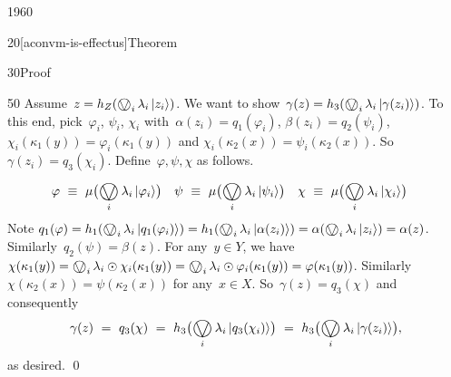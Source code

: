 \begin{parsec}{1960}
\begin{point}{20}[aconvm-is-effectus]{Theorem}
\begin{point}{30}{Proof}
\begin{point}{50}
Assume~$z = h_Z(\bigovee_i \lambda_i \ket{z_i})$.
We want to show~$\gamma(z) = h_3(\bigovee_i \lambda_i \ket{\gamma(z_i)})$.
To this end, pick~$\varphi_i$, $\psi_i$, $\chi_i$
with~$\alpha(z_i) = q_1(\varphi_i)$,
$\beta(z_i) = q_2(\psi_i)$,
$\chi_i(\kappa_1(y)) = \varphi_i(\kappa_1(y))$
and $\chi_i(\kappa_2(x)) = \psi_i(\kappa_2(x))$.
So $\gamma(z_i) = q_3(\chi_i)$.
Define~$\varphi,\psi,\chi$ as follows.
\begin{align*}
\varphi &\ \equiv\  \mu\bigl(\bigovee_i \lambda_i \ket{\varphi_i}\bigr)&
\psi &\ \equiv\  \mu\bigl(\bigovee_i \lambda_i \ket{\psi_i}\bigr) &
\chi &\ \equiv\  \mu\bigl(\bigovee_i \lambda_i \ket{\chi_i}\bigr)
\end{align*}
Note
$q_1(\varphi)
    = h_1(\bigovee_i \lambda_i \ket{q_1(\varphi_i)})
    = h_1(\bigovee_i \lambda_i \ket{\alpha(z_i)})
    = \alpha(\bigovee_i \lambda_i \ket{z_i})
    = \alpha(z)$.
Similarly~$q_2(\psi) = \beta(z)$.
For any~$y \in Y$,
    we have
    $
    \chi(\kappa_1(y))
    = \bigovee_i \lambda_i \odot \chi_i(\kappa_1(y))
    = \bigovee_i \lambda_i \odot \varphi_i(\kappa_1(y))
    = \varphi(\kappa_1(y))
    $.
Similarly~$\chi(\kappa_2(x)) = \psi(\kappa_2(x))$ for any~$x \in X$.
So~$\gamma(z) = q_3(\chi)$ and consequently
\begin{equation*}
    \gamma(z) \ = \ q_3(\chi)
    \ = \ h_3\bigl(\bigovee_i \lambda_i\ket{q_3(\chi_i)} \bigr)
    \ = \ h_3\bigl(\bigovee_i \lambda_i\ket{\gamma(z_i)} \bigr),
\end{equation*}
as desired. \qed
\end{point}
\end{point}
\end{point}
\end{parsec}

